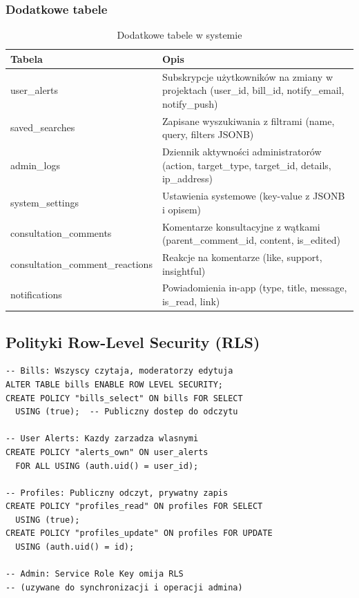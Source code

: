 \documentclass[12pt,a4paper]{article}
\begin{document}
\subsubsection{Dodatkowe tabele}

\begin{table}[H]
\centering
\renewcommand{\arraystretch}{1.3}
\footnotesize
\begin{tabularx}{\textwidth}{l X}
\toprule
\textbf{Tabela} & \textbf{Opis} \\
\midrule
user\_alerts & Subskrypcje użytkowników na zmiany w projektach (user\_id, bill\_id, notify\_email, notify\_push) \\
saved\_searches & Zapisane wyszukiwania z filtrami (name, query, filters JSONB) \\
admin\_logs & Dziennik aktywności administratorów (action, target\_type, target\_id, details, ip\_address) \\
system\_settings & Ustawienia systemowe (key-value z JSONB i opisem) \\
consultation\_comments & Komentarze konsultacyjne z wątkami (parent\_comment\_id, content, is\_edited) \\
consultation\_comment\_reactions & Reakcje na komentarze (like, support, insightful) \\
notifications & Powiadomienia in-app (type, title, message, is\_read, link) \\
\bottomrule
\end{tabularx}
\caption{Dodatkowe tabele w systemie}
\end{table}

\subsection{Polityki Row-Level Security (RLS)}

\begin{lstlisting}[style=sql, title=Kluczowe polityki RLS]
-- Bills: Wszyscy czytaja, moderatorzy edytuja
ALTER TABLE bills ENABLE ROW LEVEL SECURITY;
CREATE POLICY "bills_select" ON bills FOR SELECT
  USING (true);  -- Publiczny dostep do odczytu

-- User Alerts: Kazdy zarzadza wlasnymi
CREATE POLICY "alerts_own" ON user_alerts
  FOR ALL USING (auth.uid() = user_id);

-- Profiles: Publiczny odczyt, prywatny zapis
CREATE POLICY "profiles_read" ON profiles FOR SELECT
  USING (true);
CREATE POLICY "profiles_update" ON profiles FOR UPDATE
  USING (auth.uid() = id);

-- Admin: Service Role Key omija RLS
-- (uzywane do synchronizacji i operacji admina)
\end{lstlisting}
\end{document}
